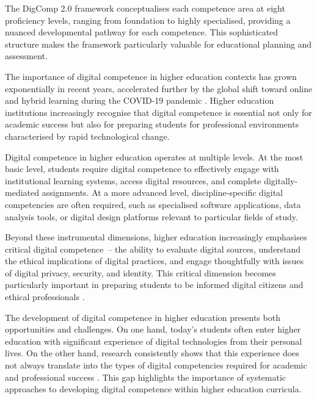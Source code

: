 \documentclass[cte]{acnsart}
\begin{document}
The DigComp 2.0 framework conceptualises each competence area at eight proficiency levels, ranging from foundation to highly specialised, providing a nuanced developmental pathway for each competence. This sophisticated structure makes the framework particularly valuable for educational planning and assessment.


The importance of digital competence in higher education contexts has grown exponentially in recent years, accelerated further by the global shift toward online and hybrid learning during the COVID-19 pandemic \cite{Vanessa2024444}. Higher education institutions increasingly recognise that digital competence is essential not only for academic success but also for preparing students for professional environments characterised by rapid technological change.

Digital competence in higher education operates at multiple levels. At the most basic level, students require digital competence to effectively engage with institutional learning systems, access digital resources, and complete digitally-mediated assignments. At a more advanced level, discipline-specific digital competencies are often required, such as specialised software applications, data analysis tools, or digital design platforms relevant to particular fields of study.

Beyond these instrumental dimensions, higher education increasingly emphasises critical digital competence~-- the ability to evaluate digital sources, understand the ethical implications of digital practices, and engage thoughtfully with issues of digital privacy, security, and identity. This critical dimension becomes particularly important in preparing students to be informed digital citizens and ethical professionals \cite{Guitert2023245}.

The development of digital competence in higher education presents both opportunities and challenges. On one hand, today's students often enter higher education with significant experience of digital technologies from their personal lives. On the other hand, research consistently shows that this experience does not always translate into the types of digital competencies required for academic and professional success \cite{Barboutidis2023613}. This gap highlights the importance of systematic approaches to developing digital competence within higher education curricula.
\end{document}
